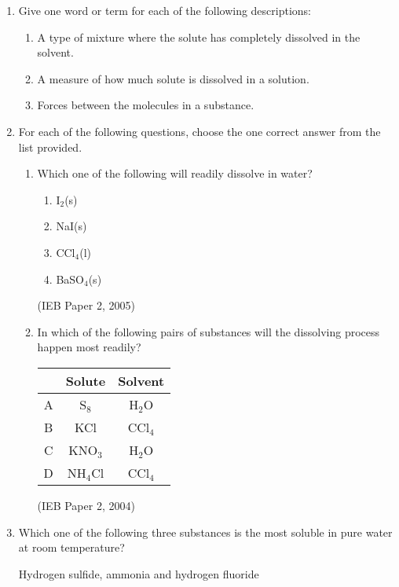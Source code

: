 \begin{eocexercises}{}

\begin{enumerate}
\item{Give one word or term for each of the following descriptions:}
\begin{enumerate}
\item{A type of mixture where the solute has completely dissolved in the solvent.}
\item{A measure of how much solute is dissolved in a solution.}
\item{Forces between the molecules in a substance.}
\end{enumerate}

\item{For each of the following questions, choose the one correct answer from the list provided.}
\renewcommand{\labelenumii}{\Alph{enumii}}

\begin{enumerate}
\item{Which one of the following will readily dissolve in water?}
\begin{enumerate}
\item{I$_{2}$(s)}
\item{NaI(s)}
\item{CCl$_{4}$(l)}
\item{BaSO$_{4}$(s)}
\end{enumerate}

(IEB Paper 2, 2005)
\renewcommand{\labelenumii}{\alph{enumii}}

\item{In which of the following pairs of substances will the dissolving process happen most readily?\\}

\begin{tabular}{|c|c|c|}\hline
& \textbf{Solute} & \textbf{Solvent} \\\hline
A & S$_{8}$ & H$_{2}$O \\\hline
B & KCl & CCl$_{4}$ \\\hline
C & KNO$_{3}$ & H$_{2}$O \\\hline
D & NH$_{4}$Cl & CCl$_{4}$ \\\hline
\end{tabular}

(IEB Paper 2, 2004)

\end{enumerate}

\item{Which one of the following three substances is the most soluble in pure water at room temperature?}
\begin{center}
Hydrogen sulfide, ammonia and hydrogen fluoride
\end{center}


\end{enumerate}
\end{eocexercises}
